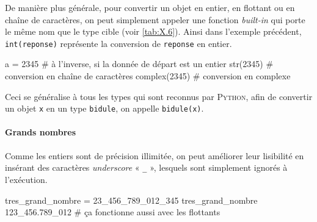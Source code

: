 
De manière plus générale, pour convertir un objet en entier, en flottant ou en chaîne de caractères, on peut simplement appeler une fonction \textit{built-in} qui porte le même nom que le type cible (voir \cref{tab:X.6}). Ainsi dans l'exemple précédent, \texttt{int(reponse)} représente la conversion de \texttt{reponse} en entier.

\begin{idleconsole}
	\begin{pyconsole}
		a = 2345  # à l'inverse, si la donnée de départ est un entier
		str(2345) # conversion en chaîne de caractères
		complex(2345) # conversion en complexe
	\end{pyconsole}
\end{idleconsole}

Ceci se généralise à tous les types qui sont reconnus par \textsc{Python}, afin de convertir un objet \texttt{x} en un type \texttt{bidule}, on appelle \texttt{bidule(x)}.

\paragraph{Grands nombres} Comme les entiers sont de précision illimitée, on peut améliorer leur lisibilité en insérant des caractères \textit{underscore} « \texttt{\_} », lesquels sont simplement ignorés à l'exécution.

\begin{idleconsole}
	\begin{pyconsole}
		tres_grand_nombre = 23_456_789_012_345
		tres_grand_nombre
		123_456.789_012 # ça fonctionne aussi avec les flottants
	\end{pyconsole}
\end{idleconsole}

